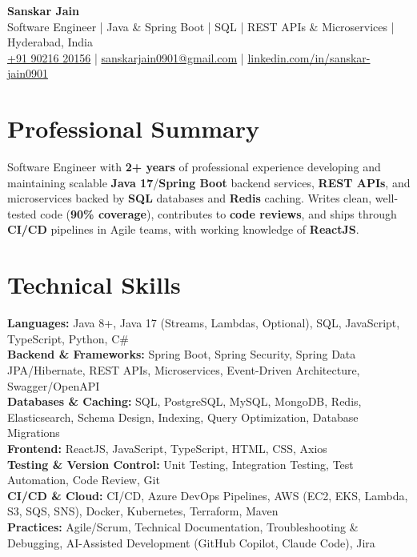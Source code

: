\documentclass[a4paper,10pt]{article}
\begin{document}
\begin{center}
    {\LARGE \textbf{Sanskar Jain}} \\
    \vspace{2pt}
    Software Engineer \;|\; Java \& Spring Boot \;|\; SQL \;|\; REST APIs \& Microservices \;|\; Hyderabad, India \\
    \vspace{2pt}
    \href{tel:+919021620156}{+91 90216 20156} \;|\;
    \href{mailto:sanskarjain0901@gmail.com}{sanskarjain0901@gmail.com} \;|\;
    \href{https://www.linkedin.com/in/sanskar-jain0901/}{linkedin.com/in/sanskar-jain0901}
\end{center}

\section*{Professional Summary}
Software Engineer with \textbf{2+ years} of professional experience developing and maintaining scalable \textbf{Java 17}/\textbf{Spring Boot} backend services, \textbf{REST APIs}, and microservices backed by \textbf{SQL} databases and \textbf{Redis} caching.
Writes clean, well-tested code (\textbf{90\% coverage}), contributes to \textbf{code reviews}, and ships through \textbf{CI/CD} pipelines in Agile teams, with working knowledge of \textbf{ReactJS}.

\section*{Technical Skills}
\begin{sloppypar}
\noindent
\textbf{Languages:} Java 8+, Java 17 (Streams, Lambdas, Optional), SQL, JavaScript, TypeScript, Python, C\# \\
\textbf{Backend \& Frameworks:} Spring Boot, Spring Security, Spring Data JPA/Hibernate, REST APIs, Microservices, Event-Driven Architecture, Swagger/OpenAPI \\
\textbf{Databases \& Caching:} SQL, PostgreSQL, MySQL, MongoDB, Redis, Elasticsearch, Schema Design, Indexing, Query Optimization, Database Migrations \\
\textbf{Frontend:} ReactJS, JavaScript, TypeScript, HTML, CSS, Axios \\
\textbf{Testing \& Version Control:} Unit Testing, Integration Testing, Test Automation, Code Review, Git \\
\textbf{CI/CD \& Cloud:} CI/CD, Azure DevOps Pipelines, AWS (EC2, EKS, Lambda, S3, SQS, SNS), Docker, Kubernetes, Terraform, Maven \\
\textbf{Practices:} Agile/Scrum, Technical Documentation, Troubleshooting \& Debugging, AI-Assisted Development (GitHub Copilot, Claude Code), Jira
\end{sloppypar}
\end{document}
